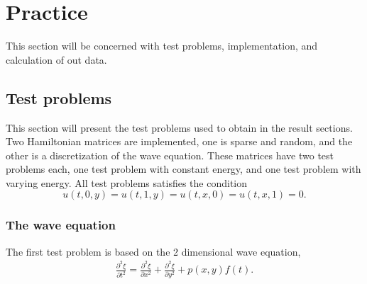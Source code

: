 \chapter{Practice}%
This section will be concerned with test problems, implementation, and calculation of out data.

\section{Test problems} %
\label{sec:testprob}
This section will present the test problems used to obtain in the result sections. \\

\noindent Two Hamiltonian matrices are implemented, one is sparse and random, and the other is a discretization of the wave equation. These matrices have two test problems each, one test problem with constant energy, and one test problem with varying energy. All test problems satisfies the condition $$u(t,0,y) = u(t,1,y) = u(t,x,0) = u(t,x,1) = 0.$$ 

\subsection{The wave equation} %
\label{sec:wave}
The first test problem is based on the 2 dimensional wave equation, 
\begin{equation}
\begin{aligned}
\frac{\partial^2 \xi}{\partial t^2} = \frac{\partial^2 \xi}{\partial x^2}+ \frac{\partial^2 \xi}{\partial y^2} + p(x,y)f(t).
\end{aligned}
\label{eqn:wave}
\end{equation}

